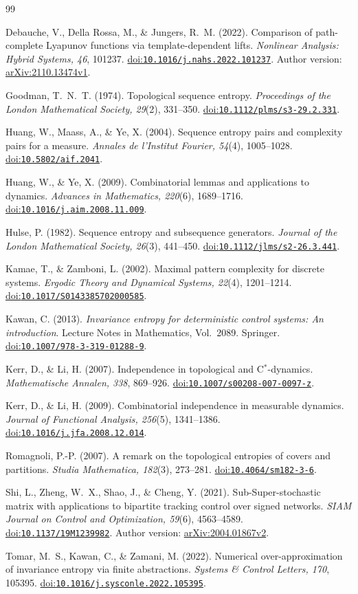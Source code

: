 \documentclass[11pt,reqno]{amsart}
\numberwithin{equation}{section}
\theoremstyle{definition}
\theoremstyle{definition}
\newcommand{\doi}[1]{\href{https://doi.org/#1}{doi:\nolinkurl{#1}}}
\begin{document}
\begin{thebibliography}{99}

Debauche, V., Della Rossa, M., \& Jungers, R.~M. (2022).
Comparison of path-complete Lyapunov functions via template-dependent lifts.
\emph{Nonlinear Analysis: Hybrid Systems, 46}, 101237.
\doi{10.1016/j.nahs.2022.101237}.
Author version: \href{https://arxiv.org/abs/2110.13474v1}{arXiv:2110.13474v1}.

Goodman, T.~N.~T. (1974). Topological sequence entropy.
\emph{Proceedings of the London Mathematical Society, 29}(2), 331--350.
\doi{10.1112/plms/s3-29.2.331}.

Huang, W., Maass, A., \& Ye, X. (2004).
Sequence entropy pairs and complexity pairs for a measure.
\emph{Annales de l'Institut Fourier, 54}(4), 1005--1028.
\doi{10.5802/aif.2041}.

Huang, W., \& Ye, X. (2009).
Combinatorial lemmas and applications to dynamics.
\emph{Advances in Mathematics, 220}(6), 1689--1716.
\doi{10.1016/j.aim.2008.11.009}.

Hulse, P. (1982). Sequence entropy and subsequence generators.
\emph{Journal of the London Mathematical Society, 26}(3), 441--450.
\doi{10.1112/jlms/s2-26.3.441}.

Kamae, T., \& Zamboni, L. (2002).
Maximal pattern complexity for discrete systems.
\emph{Ergodic Theory and Dynamical Systems, 22}(4), 1201--1214.
\doi{10.1017/S0143385702000585}.

Kawan, C. (2013).
\emph{Invariance entropy for deterministic control systems:
An introduction}. Lecture Notes in Mathematics, Vol.~2089.
Springer. \doi{10.1007/978-3-319-01288-9}.

Kerr, D., \& Li, H. (2007).
Independence in topological and C$^*$-dynamics.
\emph{Mathematische Annalen, 338}, 869--926.
\doi{10.1007/s00208-007-0097-z}.

Kerr, D., \& Li, H. (2009).
Combinatorial independence in measurable dynamics.
\emph{Journal of Functional Analysis, 256}(5), 1341--1386.
\doi{10.1016/j.jfa.2008.12.014}.

Romagnoli, P.-P. (2007).
A remark on the topological entropies of covers and partitions.
\emph{Studia Mathematica, 182}(3), 273--281.
\doi{10.4064/sm182-3-6}.

Shi, L., Zheng, W.~X., Shao, J., \& Cheng, Y. (2021).
Sub-Super-stochastic matrix with applications to bipartite tracking
control over signed networks.
\emph{SIAM Journal on Control and Optimization, 59}(6), 4563--4589.
\doi{10.1137/19M1239982}.
Author version: \href{https://arxiv.org/abs/2004.01867v2}{arXiv:2004.01867v2}.

Tomar, M.~S., Kawan, C., \& Zamani, M. (2022).
Numerical over-approximation of invariance entropy via finite abstractions.
\emph{Systems \& Control Letters, 170}, 105395.
\doi{10.1016/j.sysconle.2022.105395}.

\end{thebibliography}
\end{document}
